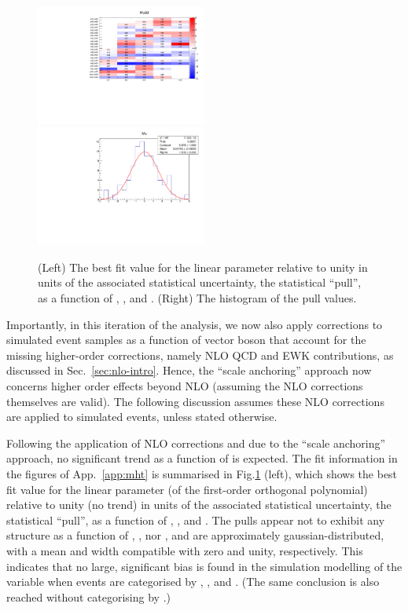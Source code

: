 \begin{figure}[h!]
  \centering
  \includegraphics[width=0.5\textwidth]{figures/mhtTemplate/exclusive/Mu_2D}~
  \includegraphics[width=0.5\textwidth]{figures/mhtTemplate/exclusive/Mu}\\
  \caption{(Left) The best fit value for the linear parameter
    relative to unity in units of the associated statistical
    uncertainty, \ie the statistical ``pull'', as a function of \njet,
    \nb, and \scalht. (Right) The histogram of the pull values.}
  \label{fig:pulls-ttw} 
\end{figure}

Importantly, in this iteration of the analysis, we now also apply
corrections to simulated event samples as a function of vector boson
\Pt that account for the missing higher-order corrections, namely NLO
QCD and EWK contributions, as discussed in
Sec.~\ref{sec:nlo-intro}. Hence, the ``scale anchoring'' approach now
concerns higher order effects beyond NLO (assuming the NLO corrections
themselves are valid). The following discussion assumes these NLO
corrections are applied to simulated events, unless stated otherwise. 

Following the application of NLO corrections and due to the ``scale
anchoring'' approach, no significant trend as a function of \mht is
expected. The fit information in the figures of App.~\ref{app:mht} is
summarised in Fig.\ref{fig:pulls-ttw} (left), which shows the best fit
value for the linear parameter (of the first-order orthogonal
polynomial) relative to unity (\ie no trend) in units of the
associated statistical uncertainty, \ie the statistical ``pull'', as a
function of \njet, \nb, and \scalht. The pulls appear not to exhibit
any structure as a function of \njet, \nb, nor \scalht, and are
approximately gaussian-distributed, with a mean and width compatible
with zero and unity, respectively. This indicates that no large,
significant bias is found in the simulation modelling of the \mht
variable when events are categorised by \njet, \scalht, and \nb. (The
same conclusion is also reached without categorising by \nb.)

